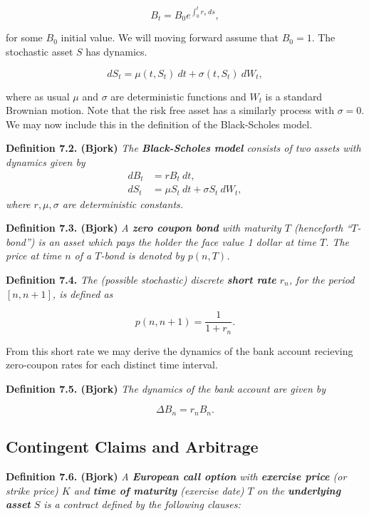 \documentclass[a4paper,12pt,openany]{book}
\begin{document}
\[
B_t=B_0e^{\int_0^tr_s\ ds},
\]

for some \(B_0\) initial value. We will moving forward assume that \(B_0=1\). The stochastic asset \(S\) has dynamics.

\[
dS_t=\mu(t,S_t)\ dt + \sigma(t,S_t)\ dW_t,\tag{7.2}
\]

where as usual \(\mu\) and \(\sigma\) are deterministic functions and \(W_t\) is a standard Brownian motion. Note that the risk free asset has a similarly process with \(\sigma = 0\). We may now include this in the definition of the Black-Scholes model.

\textbf{Definition 7.2. (Bjork)} \emph{The \textbf{Black-Scholes model} consists of two assets with dynamics given by}
\begin{align*}
dB_t&=rB_t\ dt,\tag{7.3}\\
dS_t&=\mu S_t\ dt+\sigma S_t\ dW_t,\tag{7.4}
\end{align*}
\emph{where \(r,\mu,\sigma\) are deterministic constants.}

\textbf{Definition 7.3. (Bjork)} \emph{A \textbf{zero coupon bond} with maturity \(T\) (henceforth ``\(T\)-bond'') is an asset which pays the holder the face value 1 dollar at time \(T\). The price at time \(n\) of a \(T\)-bond is denoted by \(p(n,T)\).}

\textbf{Definition 7.4.} \emph{The (possible stochastic) discrete \textbf{short rate} \(r_n\), for the period \([n,n+1]\), is defined as}

\[
p(n,n+1)=\frac{1}{1+ r_n}.\tag{7.6}
\]

From this short rate we may derive the dynamics of the bank account recieving zero-coupon rates for each distinct time interval.

\textbf{Definition 7.5. (Bjork)} \emph{The dynamics of the bank account are given by}

\[
\Delta B_n=r_n B_n.\tag{7.7}
\]

\hypertarget{contingent-claims-and-arbitrage}{%
\subsection{Contingent Claims and Arbitrage}\label{contingent-claims-and-arbitrage}}

\textbf{Definition 7.6. (Bjork)} \emph{A \textbf{European call option} with \textbf{exercise price} (or strike price) \(K\) and \textbf{time of maturity} (exercise date) \(T\) on the \textbf{underlying asset} \(S\) is a contract defined by the following clauses:}
\end{document}
